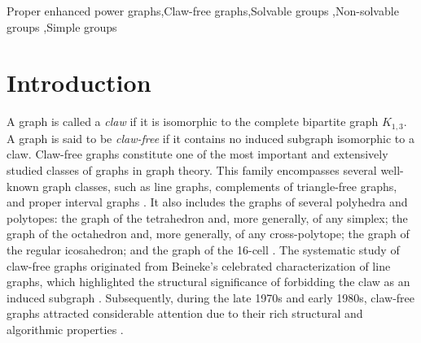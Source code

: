 \documentclass[preprint,11pt]{elsarticle}
\newcommand{\cyc}{\operatorname{Cyc}}
\newcommand{\PSL}{\operatorname{PSL}}
\newcommand{\PGL}{\operatorname{PGL}}
\begin{document}
\begin{frontmatter}
\begin{abstract}
The main objective of this paper is to investigate finite groups whose proper 
enhanced power graph is claw-free, that is, contains no induced subgraph 
isomorphic to the complete bipartite graph $K_{1,3}$. We first prove that 
$\mathcal{E}(G)$ is claw-free if and only if $G$ is cyclic. The set of 
dominating vertices of $\mathcal{E}(G)$ forms a cyclic subgroup of the center 
of $G$, namely the \emph{cyclicizer} $\cyc(G)$ of $G$. This allows us to give 
a precise description of the structure of $G/\cyc(G)$ when $\mathcal{E}^{**}(G)$ 
is claw-free. If $G$ is solvable but not nilpotent, then $G$ is metacyclic, or $G/\cyc(G)$ is either 
a Frobenius group or a $2$-Frobenius group. If $G$ is non-solvable, then 
$G/\cyc(G)$ is isomorphic to $\PSL(2,q)$ or $\PGL(2,q),$ and this allows us to give a complete classification of the non-solvable
groups whose proper enhanced power graph is claw-free.
\end{abstract}
		
		
		\begin{keyword}
			 Proper enhanced power graphs\sep Claw-free graphs\sep Solvable groups \sep Non-solvable groups \sep Simple groups
			\medskip  
			
			
		\end{keyword}
		
	\end{frontmatter}


    \section{Introduction}
A graph is called a \emph{claw} if it is isomorphic to the complete bipartite graph $K_{1,3}$. A graph is said to be \emph{claw-free} if it contains no induced subgraph isomorphic to a claw.
Claw-free graphs constitute one of the most important and extensively studied classes of graphs in graph theory. This family encompasses several well-known graph classes, such as line graphs, complements of triangle-free graphs, and proper interval graphs \cite{clawfreesurvey}. It also includes the graphs of several polyhedra and polytopes: the graph of the tetrahedron and, more generally, of any simplex; the graph of the octahedron and, more generally, of any cross-polytope; the graph of the regular icosahedron; and the graph of the 16-cell \cite{clawfree2005}.
 The systematic study of claw-free graphs originated from Beineke's celebrated characterization of line graphs, which highlighted the structural significance of forbidding the claw as an induced subgraph \cite{Beineke1970}. Subsequently, during the late 1970s and early 1980s, claw-free graphs attracted considerable attention due to their rich structural and algorithmic properties \cite{Edmonds1965,Minty1980}. 
   
\end{document}
